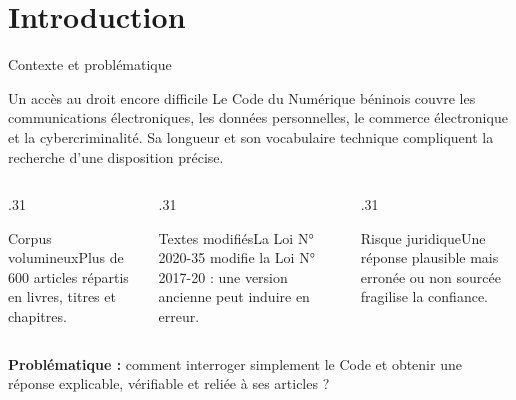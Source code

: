 \documentclass[aspectratio=169,10pt]{beamer}
\begin{document}
\section{Introduction}
\begin{frame}{Contexte et problématique}
  \begin{block}{Un accès au droit encore difficile}
    Le Code du Numérique béninois couvre les communications électroniques, les données personnelles, le commerce électronique et la cybercriminalité. Sa longueur et son vocabulaire technique compliquent la recherche d'une disposition précise.
  \end{block}
  \begin{columns}[T,onlytextwidth]
    \begin{column}{.31\textwidth}\begin{block}{Corpus volumineux}Plus de 600 articles répartis en livres, titres et chapitres.\end{block}\end{column}
    \begin{column}{.31\textwidth}\begin{block}{Textes modifiés}La Loi N° 2020-35 modifie la Loi N° 2017-20 : une version ancienne peut induire en erreur.\end{block}\end{column}
    \begin{column}{.31\textwidth}\begin{block}{Risque juridique}Une réponse plausible mais erronée ou non sourcée fragilise la confiance.\end{block}\end{column}
  \end{columns}
  \vspace{0.2cm}\centering\textbf{Problématique :} comment interroger simplement le Code et obtenir une réponse explicable, vérifiable et reliée à ses articles ?
\end{frame}
\end{document}
